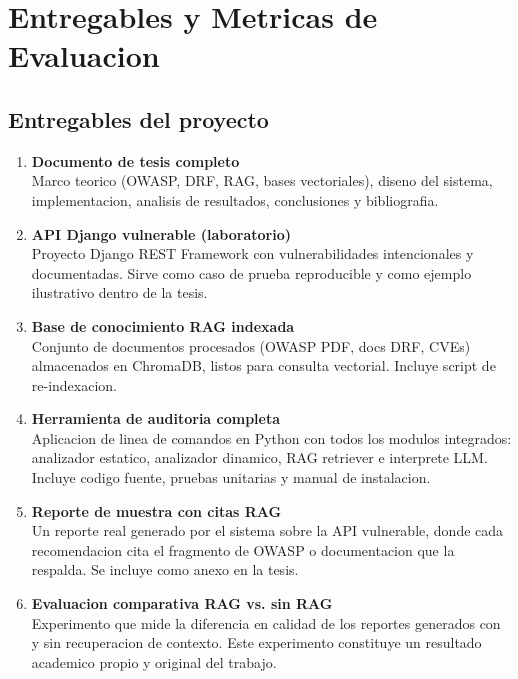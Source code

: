 \documentclass[12pt, a4paper]{article}
\begin{document}
\newpage
\section{Entregables y Metricas de Evaluacion}

\subsection{Entregables del proyecto}

\begin{enumerate}[leftmargin=1.5em, itemsep=10pt]

  \item \textbf{Documento de tesis completo}\\
  Marco teorico (OWASP, DRF, RAG, bases vectoriales), diseno del sistema, implementacion, analisis de resultados, conclusiones y bibliografia.

  \item \textbf{API Django vulnerable (laboratorio)}\\
  Proyecto Django REST Framework con vulnerabilidades intencionales y documentadas. Sirve como caso de prueba reproducible y como ejemplo ilustrativo dentro de la tesis.

  \item \textbf{Base de conocimiento RAG indexada}\\
  Conjunto de documentos procesados (OWASP PDF, docs DRF, CVEs) almacenados en ChromaDB, listos para consulta vectorial. Incluye script de re-indexacion.

  \item \textbf{Herramienta de auditoria completa}\\
  Aplicacion de linea de comandos en Python con todos los modulos integrados: analizador estatico, analizador dinamico, RAG retriever e interprete LLM. Incluye codigo fuente, pruebas unitarias y manual de instalacion.

  \item \textbf{Reporte de muestra con citas RAG}\\
  Un reporte real generado por el sistema sobre la API vulnerable, donde cada recomendacion cita el fragmento de OWASP o documentacion que la respalda. Se incluye como anexo en la tesis.

  \item \textbf{Evaluacion comparativa RAG vs. sin RAG}\\
  Experimento que mide la diferencia en calidad de los reportes generados con y sin recuperacion de contexto. Este experimento constituye un resultado academico propio y original del trabajo.

\end{enumerate}
\end{document}
